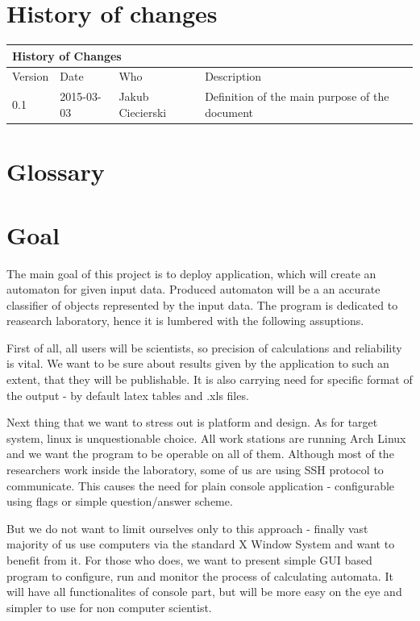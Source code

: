 \documentclass{article}
\begin{document}
\section{History of changes}

\begin{table}[h]
\hspace*{-2.1cm}
\large
\begin{tabular}{|l|l|l|l|}
\hline
\multicolumn{4}{|l|}{\cellcolor[HTML]{C0C0C0}History of Changes} \\ \hline
Version         & Date         & Who        & Description        \\ \hline
0.1         & 2015-03-03         & Jakub Ciecierski        & Definition of the main purpose of the document       \\ \hline
\end{tabular}
\end{table}


\section{Glossary} 

\section{Goal}
The main goal of this project is to deploy application, which will create an automaton for given input data. Produced automaton will be a an accurate classifier of objects represented
by the input data. The program is dedicated to reasearch laboratory, hence it is lumbered with the following assuptions.


First of all, all users will be scientists, so precision of calculations and reliability is vital. We want to be sure about results given by the application to such an extent, that they will be publishable. It is also carrying need for specific format of the output - by default latex tables and .xls files.


Next thing that we want to stress out is platform and design. As for target system, linux is unquestionable choice. All work stations are running Arch Linux and we want the program to be operable on all of them. Although most of the researchers work inside the laboratory, some of us are using SSH protocol to communicate. This causes the need for plain console application - configurable using flags or simple question/answer scheme. 

But we do not want to limit ourselves only to this approach - finally vast majority of us use computers via the standard X Window System and want to benefit from it. For those who does, we want to present simple GUI based program to configure, run and monitor the process of calculating automata. It will have all functionalites of console part, but will be more easy on the eye and simpler to use for non computer scientist.
\end{document}
